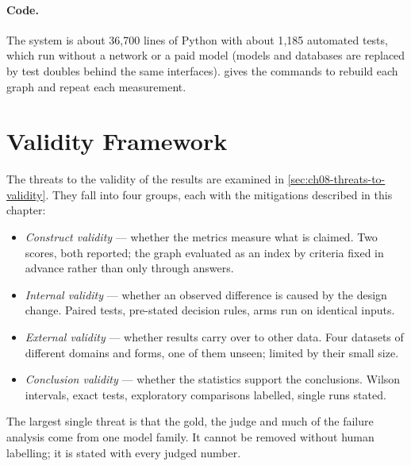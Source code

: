 \paragraph{Code.} The system is about 36{,}700 lines of Python with about 1{,}185 automated tests, which run
without a network or a paid model (models and databases are replaced by test doubles behind the same
interfaces).  gives the commands to rebuild each graph and repeat each
measurement.

\section{Validity Framework}\label{sec:ch03-validity-framework}

The threats to the validity of the results are examined in \cref{sec:ch08-threats-to-validity}. They fall
into four groups, each with the mitigations described in this chapter:
\begin{itemize}[nosep]
\item \emph{Construct validity} --- whether the metrics measure what is claimed. Two scores, both reported; the
graph evaluated as an index by criteria fixed in advance rather than only through answers.
\item \emph{Internal validity} --- whether an observed difference is caused by the design change. Paired tests,
pre-stated decision rules, arms run on identical inputs.
\item \emph{External validity} --- whether results carry over to other data. Four datasets of different domains
and forms, one of them unseen; limited by their small size.
\item \emph{Conclusion validity} --- whether the statistics support the conclusions. Wilson intervals,
exact tests, exploratory comparisons labelled, single runs stated.
\end{itemize}
The largest single threat is that the gold, the judge and much of the failure analysis come from one model
family. It cannot be removed without human labelling; it is stated with every judged number.
